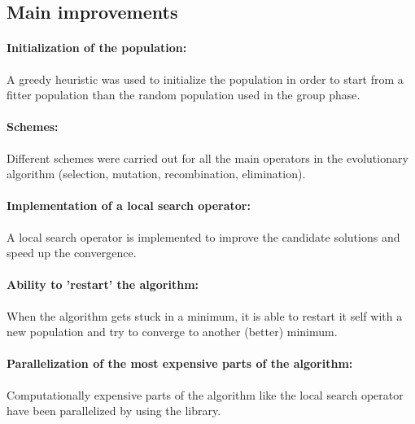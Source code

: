 \documentclass[a4paper,10pt]{article}
\newcommand{\ReplaceMe}[1]{{\color{blue}#1}}
\newcommand{\RemoveMe}[1]{{\color{purple}#1}}
\begin{document}

\subsection{Main improvements}


\paragraph{Initialization of the population:}A greedy heuristic was used to initialize the population in order to start from a fitter population than the random population used in the group phase.

\paragraph{Schemes:} Different schemes were carried out for all the main operators in the evolutionary algorithm (selection, mutation, recombination, elimination).

\paragraph{Implementation of a local search operator:} A local search operator is implemented to improve the candidate solutions and speed up the convergence.

\paragraph{Ability to 'restart' the algorithm:} When the algorithm gets stuck in a minimum, it is able to restart it self with a new population and try to converge to another (better) minimum.


\paragraph{Parallelization of the most expensive parts of the algorithm:} Computationally expensive parts of the algorithm like the local search operator have been parallelized by using the  library.
\end{document}
